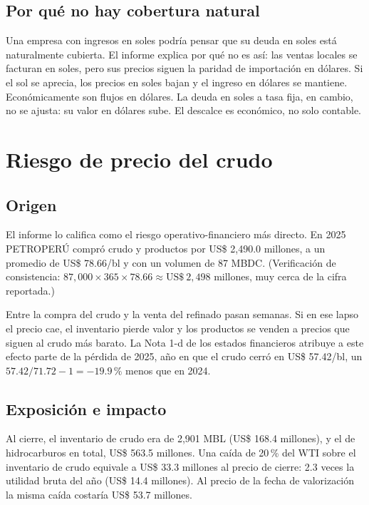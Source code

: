 \subsection{Por qué no hay cobertura natural}

Una empresa con ingresos en soles podría pensar que su deuda en soles está naturalmente cubierta. El informe explica por qué no es así: las ventas locales se facturan en soles, pero sus precios siguen la paridad de importación en dólares. Si el sol se aprecia, los precios en soles bajan y el ingreso en dólares se mantiene. Económicamente son flujos en dólares. La deuda en soles a tasa fija, en cambio, no se ajusta: su valor en dólares sube. El descalce es económico, no solo contable.

\section{Riesgo de precio del crudo}

\subsection{Origen}

El informe lo califica como el riesgo operativo-financiero más directo. En 2025 PETROPERÚ compró crudo y productos por US\$ 2,490.0 millones, a un promedio de US\$ 78.66/bl y con un volumen de 87 MBDC. (Verificación de consistencia: $87{,}000\times365\times78.66\approx\text{US\$}~2{,}498$ millones, muy cerca de la cifra reportada.)

Entre la compra del crudo y la venta del refinado pasan semanas. Si en ese lapso el precio cae, el inventario pierde valor y los productos se venden a precios que siguen al crudo más barato. La Nota 1-d de los estados financieros atribuye a este efecto parte de la pérdida de 2025, año en que el crudo cerró en US\$ 57.42/bl, un $57.42/71.72-1=-19.9\,\%$ menos que en 2024.

\subsection{Exposición e impacto}

Al cierre, el inventario de crudo era de 2,901 MBL (US\$ 168.4 millones), y el de hidrocarburos en total, US\$ 563.5 millones. Una caída de 20\,\% del WTI sobre el inventario de crudo equivale a US\$ 33.3 millones al precio de cierre: 2.3 veces la utilidad bruta del año (US\$ 14.4 millones). Al precio de la fecha de valorización la misma caída costaría US\$ 53.7 millones.

